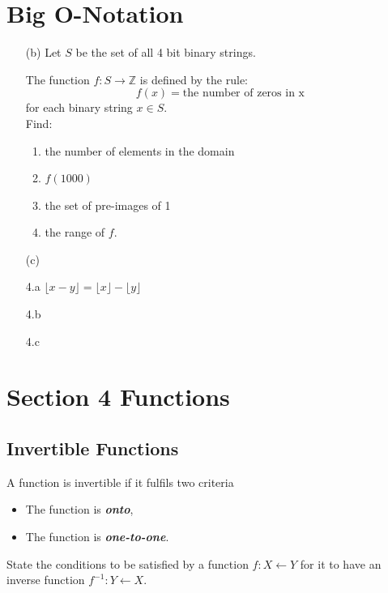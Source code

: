 \documentclass[]{report}
\begin{document}
\section{Big O-Notation}

\begin{itemize}
\item[(b)] Let $S$ be the set of all 4 bit binary strings. 

The function $f : S \rightarrow \mathbb{Z}$
is defined by the rule:
\[f(x) = \mbox{the number of zeros in x}\]
for each binary string $x \in S$.\\
Find:
\begin{enumerate}
\item the number of elements in the domain
\item $f(1000)$
\item the set of pre-images of 1
\item the range of $f$.
\end{enumerate}
\item[(c)]
\end{itemize}
\newpage
\begin{itemize}
\item[4.a] $ \lfloor x - y \rfloor = \lfloor x \rfloor - \lfloor y \rfloor$
\item[4.b]
\item[4.c]
\end{itemize}
\newpage
\section{Section 4 Functions}

\subsection{Invertible Functions}
A function is invertible if it fulfils two criteria
\begin{itemize}
\item The function is \textbf{\textit{onto}},
\item The function is \textbf{\textit{one-to-one}}.
\end{itemize}

State the conditions to be satisfied by a function
$f : X \leftarrow Y$ for it to have an inverse function
$f^{-1} : Y \leftarrow X$.
\end{document}

